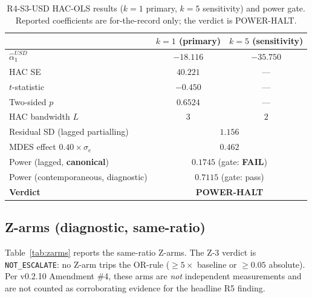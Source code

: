 \documentclass[11pt,letterpaper]{article}
\begin{document}
\begin{table}[h]
\centering
\caption{R4-S3-USD HAC-OLS results (\(k=1\) primary, \(k=5\)
  sensitivity) and power gate. Reported coefficients are for-the-record
  only; the verdict is POWER-HALT.}
\label{tab:r4s3usd}
\begin{tabular}{lcc}
\toprule
                                         & \(k=1\) (primary)   & \(k=5\) (sensitivity) \\
\midrule
\(\hat\alpha_1^{USD}\)                   & \(-18.116\)         & \(-35.750\) \\
HAC SE                                   & \(40.221\)          & --- \\
\(t\)-statistic                          & \(-0.450\)          & --- \\
Two-sided \(p\)                          & \(0.6524\)          & --- \\
HAC bandwidth \(L\)                      & \(3\)               & \(2\) \\
\midrule
Residual SD (lagged partialling)         & \multicolumn{2}{c}{\(1.156\)} \\
MDES effect \(0.40 \times \sigma_e\)     & \multicolumn{2}{c}{\(0.462\)} \\
Power (lagged, \textbf{canonical})       & \multicolumn{2}{c}{\(\mathbf{0.1745}\) (gate: \textbf{FAIL})} \\
Power (contemporaneous, diagnostic)      & \multicolumn{2}{c}{\(0.7115\) (gate: pass)} \\
\midrule
\textbf{Verdict}                         & \multicolumn{2}{c}{\textbf{POWER-HALT}} \\
\bottomrule
\end{tabular}
\end{table}

\subsection{Z-arms (diagnostic, same-ratio)}

Table~\ref{tab:zarms} reports the same-ratio Z-arms. The Z-3 verdict
is \texttt{NOT\_ESCALATE}: no Z-arm trips the OR-rule
(\(\geq 5\!\times\) baseline or \(\geq 0.05\) absolute). Per v0.2.10
Amendment \#4, these arms are \emph{not} independent measurements
and are not counted as corroborating evidence for the headline R5
finding.
\end{document}
